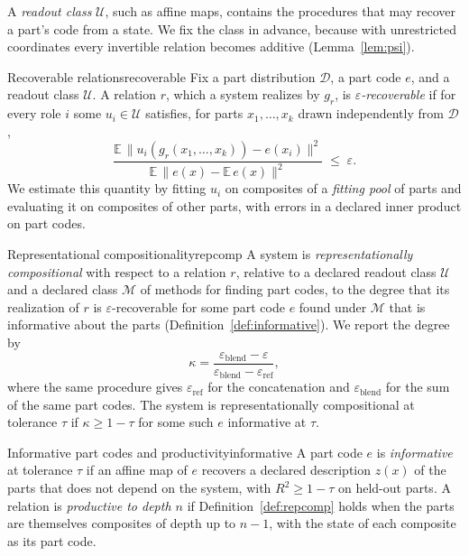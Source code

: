 \documentclass[10pt]{article}
\theoremstyle{plain}
\theoremstyle{remark}
\newcommand{\U}{\mathcal{U}}
\newcommand{\M}{\mathcal{M}}
\newcommand{\D}{\mathcal{D}}
\begin{document}
A \emph{readout class} $\U$, such as affine maps, contains the procedures that may recover a part's code from a state. We fix the class in advance, because with unrestricted coordinates every invertible relation becomes additive (Lemma~\ref{lem:psi}).

\begin{defbox}{Recoverable relations}{recoverable}
Fix a part distribution $\D$, a part code $e$, and a readout class $\U$. A relation $r$, which a system realizes by $g_r$, is \emph{$\varepsilon$-recoverable} if for every role $i$ some $u_i \in \U$ satisfies, for parts $x_1, \ldots, x_k$ drawn independently from $\D$,
\begin{equation}
  \frac{\mathbb{E}\,\lVert u_i(g_r(x_1,\ldots,x_k)) - e(x_i) \rVert^2}{\mathbb{E}\,\lVert e(x) - \mathbb{E}\,e(x) \rVert^2} \;\le\; \varepsilon .
  \label{eq:recover}
\end{equation}
We estimate this quantity by fitting $u_i$ on composites of a \emph{fitting pool} of parts and evaluating it on composites of other parts, with errors in a declared inner product on part codes.
\end{defbox}

\begin{defbox}{Representational compositionality}{repcomp}
A system is \emph{representationally compositional} with respect to a relation $r$, relative to a declared readout class $\U$ and a declared class $\M$ of methods for finding part codes, to the degree that its realization of $r$ is $\varepsilon$-recoverable for some part code $e$ found under $\M$ that is informative about the parts (Definition~\ref{def:informative}). We report the degree by
\begin{equation}
  \kappa = \frac{\varepsilon_{\mathrm{blend}} - \varepsilon}{\varepsilon_{\mathrm{blend}} - \varepsilon_{\mathrm{ref}}},
  \label{eq:kappa}
\end{equation}
where the same procedure gives $\varepsilon_{\mathrm{ref}}$ for the concatenation and $\varepsilon_{\mathrm{blend}}$ for the sum of the same part codes. The system is representationally compositional at tolerance $\tau$ if $\kappa \ge 1 - \tau$ for some such $e$ informative at $\tau$.
\end{defbox}

\begin{defbox}{Informative part codes and productivity}{informative}
A part code $e$ is \emph{informative} at tolerance $\tau$ if an affine map of $e$ recovers a declared description $z(x)$ of the parts that does not depend on the system, with $R^2 \ge 1 - \tau$ on held-out parts. A relation is \emph{productive to depth $n$} if Definition~\ref{def:repcomp} holds when the parts are themselves composites of depth up to $n - 1$, with the state of each composite as its part code.
\end{defbox}
\end{document}
